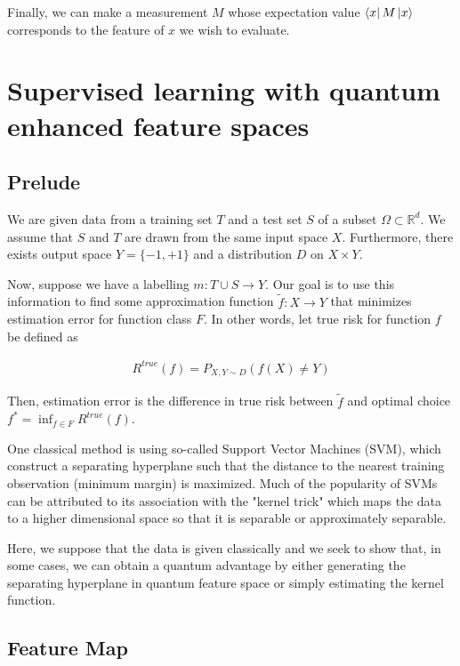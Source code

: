 \documentclass[11pt]{article}
\newcommand\0{\mathbf{0}}
\newcommand\RR{\mathbb{R}}
\newcommand\<{\langle}
\renewcommand\>{\rangle}
\begin{document}
Finally, we can make a measurement $M$ whose expectation value $\bra{x}M\ket{x}$ corresponds to the feature of $x$ we wish to evaluate. 

\section{Supervised learning with quantum enhanced feature spaces}

\subsection{Prelude}

We are given data from a training set $T$ and a test set $S$ of a subset $\Omega \subset \RR^d$. We assume that $S$ and $T$ are drawn from the same input space $X$. Furthermore, there exists output space $Y = \{ -1, +1 \} $ and a distribution $D$ on $X \times Y$.

Now, suppose we have a labelling $m: T \cup S \rightarrow Y$.  Our goal is to use this information to find some approximation function $\tilde{f} : X \rightarrow Y$ that minimizes estimation error for function class $F$. In other words, let true risk for function $f$ be defined as

\begin{align*}
R^{true}(f) = P_{X, Y \sim D}(f(X) \neq Y)	
\end{align*}

Then, estimation error is the difference in true risk between $\tilde{f}$ and optimal choice $f^* = \inf_{f \in F}R^{true}(f)$.

One classical method is using so-called Support Vector Machines (SVM), which construct a separating hyperplane such that the distance to the nearest training observation (minimum margin) is maximized. Much of the popularity of SVMs can be attributed to its association with the "kernel trick" which maps the data to a higher dimensional space so that it is separable or approximately separable.

Here, we suppose that the data is given classically and we seek to show that, in some cases, we can obtain a quantum advantage by either generating the separating hyperplane in quantum feature space or simply estimating the kernel function.

\subsection{Feature Map}
\end{document}
